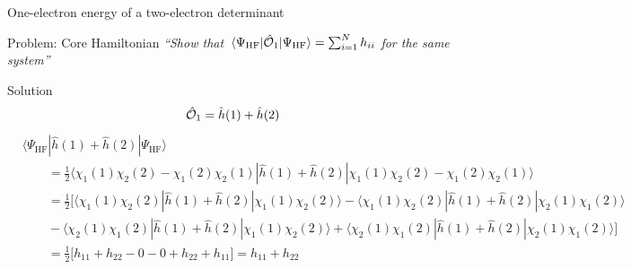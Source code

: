 \documentclass[aspectratio=169,9pt]{beamer}
\newcommand{\hh}{\hat{h}}
\newcommand{\chO}{\Hat{\mathcal{O}}}
\newcommand{\violet}[1]{\textcolor{hfViolet}{#1}}
\begin{document}
\begin{frame}{One-electron energy of a two-electron determinant}
	\begin{block}{Problem: Core Hamiltonian}
		\textit{\violet{``Show that $ \mel{\Psi_\text{HF}}{\chO_1}{\Psi_\text{HF}}  = \sum_{i=1}^N h_{ii}  $ for the same system''}}
	\end{block}
	\pause
	\begin{block}{Solution}
		\small
		\begin{equation*}
			\chO_1 = \hh(1) + \hh(2)
		\end{equation*}
		\begin{equation*}
		\begin{split}
			& \langle \Psi_\text{HF} | \hh(1) + \hh(2) | \Psi_\text{HF} \rangle 
			\\
			& \qquad = \frac{1}{2} \langle \chi_1(1) \chi_2(2) -  \chi_1(2) \chi_2(1) | \hh(1) + \hh(2) | \chi_1(1) \chi_2(2) -  \chi_1(2) \chi_2(1) \rangle
			\\
			&  \qquad = \frac{1}{2} \Big[ 
			\langle \chi_1(1) \chi_2(2)  | \hh(1) + \hh(2) | \chi_1(1) \chi_2(2)  \rangle
			- \langle \chi_1(1) \chi_2(2)  | \hh(1) + \hh(2) |  \chi_2(1) \chi_1(2) \rangle
			\\
			&  \qquad - \langle  \chi_2(1) \chi_1(2) | \hh(1) + \hh(2) | \chi_1(1) \chi_2(2)  \rangle
			+ \langle  \chi_2(1) \chi_1(2) | \hh(1) + \hh(2) |  \chi_2(1) \chi_1(2) \rangle
			\Big]
			\\
			&  \qquad =  \frac{1}{2} \Big[ h_{11} + h_{22} - 0 - 0 + h_{22} + h_{11} \Big] = h_{11} + h_{22}
		\end{split}
		\end{equation*}
	\end{block}
\end{frame}
\end{document}
